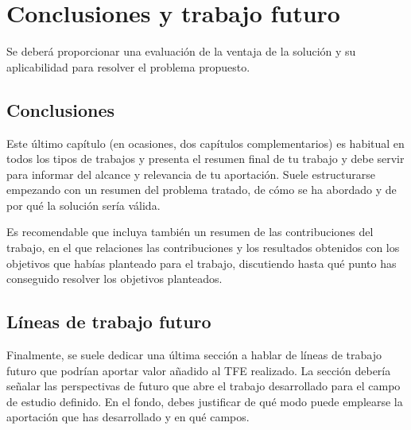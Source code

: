 \section{Conclusiones y trabajo futuro}

Se deberá proporcionar una evaluación de la ventaja de la solución y su aplicabilidad para resolver el problema propuesto.

\subsection{Conclusiones}

Este último capítulo (en ocasiones, dos capítulos complementarios) es habitual en todos los tipos de trabajos y presenta el resumen final de tu trabajo y debe servir para informar del alcance y relevancia de tu aportación.
Suele estructurarse empezando con un resumen del problema tratado, de cómo se ha abordado y de por qué la solución sería válida.

Es recomendable que incluya también un resumen de las contribuciones del trabajo, en el que relaciones las contribuciones y los resultados obtenidos con los objetivos que habías planteado para el trabajo, discutiendo hasta qué punto has conseguido resolver los objetivos planteados.

\subsection{Líneas de trabajo futuro}

Finalmente, se suele dedicar una última sección a hablar de líneas de trabajo futuro que podrían aportar valor añadido al TFE realizado. La sección debería señalar las perspectivas de futuro que abre el trabajo desarrollado para el campo de estudio definido. En el fondo, debes justificar de qué modo puede emplearse la aportación que has desarrollado y en qué campos.